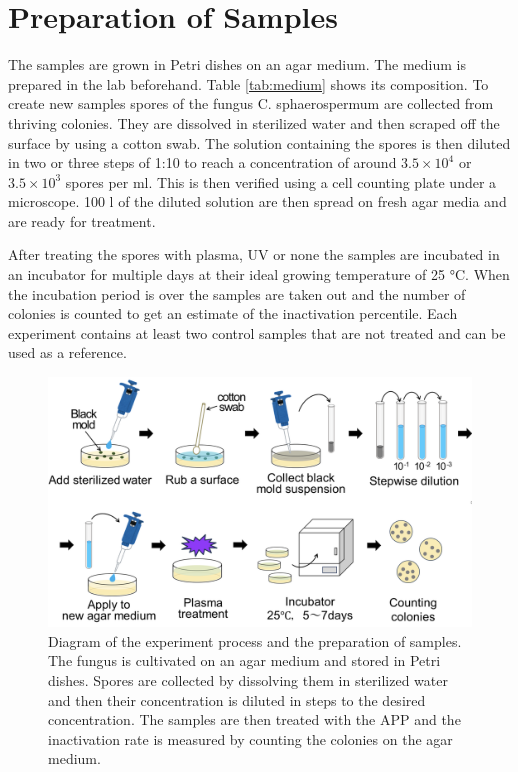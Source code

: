 \section{Preparation of Samples}
The samples are grown in Petri dishes on an agar medium. The medium is prepared in the lab beforehand. Table \ref{tab:medium} shows its composition. To create new samples spores of the fungus C. sphaerospermum are collected from thriving colonies. They are dissolved in sterilized water and then scraped off the surface by using a cotton swab. The solution containing the spores is then diluted in two or three steps of 1:10 to reach a concentration of around $3.5\times 10^4$ or $3.5\times 10^3$ spores per ml. This is then verified using a cell counting plate under a microscope. 100 \textmu l of the diluted solution are then spread on fresh agar media and are ready for treatment.

After treating the spores with plasma, UV or none the samples are incubated in an incubator for multiple days at their ideal growing temperature of 25 °C. When the incubation period is over the samples are taken out and the number of colonies is counted to get an estimate of the inactivation percentile. Each experiment contains at least two control samples that are not treated and can be used as a reference.

\begin{figure}
    \centering
    \includegraphics[width=1\textwidth]{images/Process.png}
    \caption[Diagram of the experiment process]{Diagram of the experiment process and the preparation of samples. The fungus is cultivated on an agar medium and stored in Petri dishes. Spores are collected by dissolving them in sterilized water and then their concentration is diluted in steps to the desired concentration. The samples are then treated with the APP and the inactivation rate is measured by counting the colonies on the agar medium.}
    \label{fig:process}
\end{figure}


